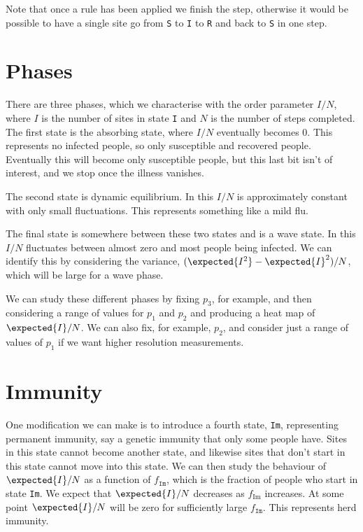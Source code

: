 \documentclass[fleqn]{NotesClass}
\begin{document}
    Note that once a rule has been applied we finish the step, otherwise it would be possible to have a single site go from \texttt{S} to \texttt{I} to \texttt{R} and back to \texttt{S} in one step.
    
    \section{Phases}
    There are three phases, which we characterise with the order parameter \(I/N\), where \(I\) is the number of sites in state \texttt{I} and \(N\) is the number of steps completed.
    The first state is the absorbing state, where \(I/N\) eventually becomes 0.
    This represents no infected people, so only susceptible and recovered people.
    Eventually this will become only susceptible people, but this last bit isn't of interest, and we stop once the illness vanishes.
    
    The second state is dynamic equilibrium.
    In this \(I/N\) is approximately constant with only small fluctuations.
    This represents something like a mild flu.
    
    The final state is somewhere between these two states and is a wave state.
    In this \(I/N\) fluctuates between almost zero and most people being infected.
    We can identify this by considering the variance, \((\expected{I^2} - \expected{I}^2) / N\), which will be large for a wave phase.
    
    We can study these different phases by fixing \(p_3\), for example, and then considering a range of values for \(p_1\) and \(p_2\) and producing a heat map of \(\expected{I}/N\).
    We can also fix, for example, \(p_2\), and consider just a range of values of \(p_1\) if we want higher resolution measurements.
    
    \section{Immunity}
    One modification we can make is to introduce a fourth state, \texttt{Im}, representing permanent immunity, say a genetic immunity that only some people have.
    Sites in this state cannot become another state, and likewise sites that don't start in this state cannot move into this state.
    We can then study the behaviour of \(\expected{I}/N\) as a function of \(f_{\mathtt{Im}}\), which is the fraction of people who start in state \texttt{Im}.
    We expect that \(\expected{I}/N\) decreases as \(f_{\mathrm{Im}}\) increases.
    At some point \(\expected{I}/N\) will be zero for sufficiently large \(f_{\mathtt{Im}}\).
    This represents herd immunity.
    
\end{document}
